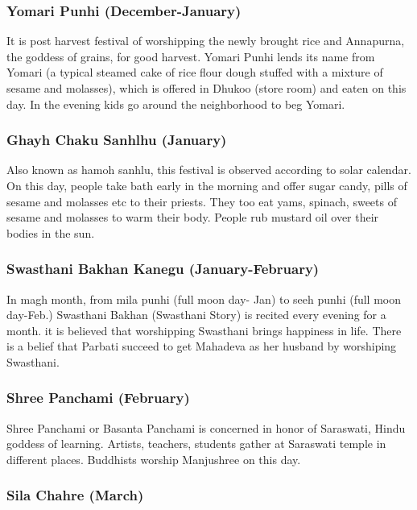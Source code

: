 \documentclass[a4paper,13pt, margin=0.9in]{article}
\begin{document}
\begin{flushleft}
\subsubsection{Yomari Punhi (December-January)}

It is post harvest festival of worshipping the newly brought rice and Annapurna, the goddess of grains, for good harvest. Yomari Punhi lends its name from Yomari (a typical steamed cake of rice flour dough stuffed with a mixture of sesame and molasses), which is offered in Dhukoo (store room) and eaten on this day. In the evening kids go around the neighborhood to beg Yomari.

\subsubsection{Ghayh Chaku Sanhlhu (January)}

Also known as hamoh sanhlu, this festival is observed according to solar calendar. On this day, people take bath early in the morning and offer sugar candy, pills of sesame and molasses etc to their priests. They too eat yams, spinach, sweets of sesame and molasses to warm their body. People rub mustard oil over their bodies in the sun.

\subsubsection{Swasthani Bakhan Kanegu (January-February)}

In magh month, from mila punhi (full moon day- Jan) to seeh punhi (full moon day-Feb.) Swasthani Bakhan (Swasthani Story) is recited every evening for a month. it is believed that worshipping Swasthani brings happiness in life. There is a belief that Parbati succeed to get Mahadeva as her husband by worshiping Swasthani.

\subsubsection{Shree Panchami (February)}

Shree Panchami or Basanta Panchami is concerned in honor of Saraswati, Hindu goddess of learning. Artists, teachers, students gather at Saraswati temple in different places. Buddhists worship Manjushree on this day.

\subsubsection{Sila Chahre (March)}


\end{flushleft}
\end{document}
